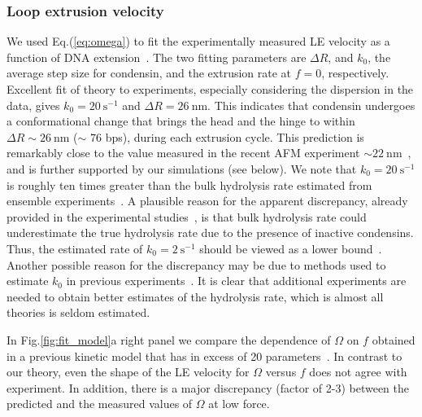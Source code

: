 \documentclass[fleqn,10pt]{wlscirep}
\newcommand{\nm}{\ \mathrm{nm}}
\newcommand{\persec}{\ \mathrm{s}^{-1}}
\newcommand{\DR}{\Delta {R}}
\begin{document}
\subsubsection*{Loop extrusion velocity}
We used Eq.(\ref{eq:omega}) to fit the experimentally measured LE velocity as a function of DNA extension~\cite{ganji2018real}. The two fitting parameters are $\DR$, and $k_0$, the average step size for condensin, and the extrusion rate at $f=0$, respectively. Excellent  fit of theory to experiments, especially considering the  dispersion in the data, gives  $k_0=20 \persec$ and $\DR=26 \nm$.  This indicates that condensin  undergoes a conformational change that brings the head and the hinge to within $\Delta R \sim 26 \nm$ ($\sim$ 76 bps), during each extrusion cycle. This prediction is remarkably close to the value measured in the recent AFM experiment $\sim 22\nm$~\cite{ryu2020condensin}, and is further supported by our simulations (see below).
We note that $k_0=20 \persec$ is roughly ten times greater than the bulk hydrolysis rate estimated from ensemble experiments~\cite{ganji2018real,terakawa2017condensin}. 
A plausible reason for the apparent discrepancy, already provided in the experimental studies~\cite{ganji2018real,terakawa2017condensin}, is that  bulk hydrolysis rate could underestimate the true hydrolysis rate due to the presence of inactive condensins. Thus, the estimated rate of $k_0 = 2 \persec$ should be viewed as a lower bound~\cite{ganji2018real}. Another possible reason for the discrepancy may be due to methods used to estimate $k_0$ in previous experiments~\cite{ganji2018real,terakawa2017condensin}. It is clear that additional experiments are needed to obtain better estimates of the hydrolysis rate, which is almost all theories is seldom estimated.%


In Fig.\ref{fig:fit_model}a right panel we compare the dependence of $\Omega$ on $f$ obtained in a previous kinetic model that has in excess of 20 parameters~\cite{marko2019dna}. In contrast to our theory, even the shape of the LE velocity for $\Omega$ versus $f$ does not agree with experiment. In addition, there is a major discrepancy (factor of 2-3) between the predicted and the measured values of $\Omega$ at low force.  
\end{document}
